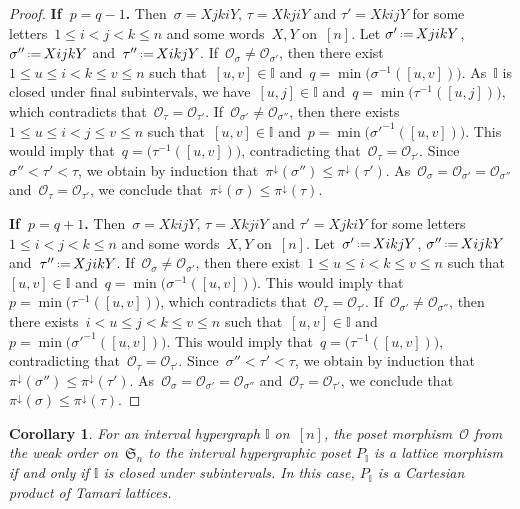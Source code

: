 \documentclass{amsart}
\newtheorem{corollary}[theorem]{Corollary}
\theoremstyle{definition}
\newcommand{\eqdef}{\mbox{\,\raisebox{0.2ex}{\scriptsize\ensuremath{\mathrm:}}\ensuremath{=}\,}} %
\newcommand{\para}[1]{\medskip\noindent\textbf{#1}} %
\newcommand{\fS}{\mathfrak{S}} %
\newcommand{\projDown}{\pi^\downarrow} %
\newcommand{\Or}{\mathcal O}  %
\newcommand{\II}{\mathbb I} %
\begin{document}
\begin{proof}
\para{If~$p = q-1$.} Then~$\sigma = X j k i Y$, $\tau = X k j i Y$ and $\tau' = X k i j Y$ for some letters~$1 \le i < j < k \le n$ and some words~$X,Y$ on~$[n]$.
Let $\sigma' \eqdef X j i k Y$, $\sigma'' \eqdef X i j k Y$ and~$\tau'' \eqdef X i k j Y$.
If~$\Or_\sigma \ne \Or_{\sigma'}$, then there exist~$1 \le u \le i < k \le v \le n$ such that~$[u,v] \in \II$ and~$q = \min \big( \sigma^{-1}([u,v]) \big)$. 
As~$\II$ is closed under final subintervals, we have~$[u,j] \in \II$ and~$q = \min \big( \tau^{-1}([u,j]) \big)$, which contradicts that~$\Or_\tau = \Or_{\tau'}$.
If~$\Or_{\sigma'} \ne \Or_{\sigma''}$, then there exists~$1 \le u \le i < j \le v \le n$ such that~$[u,v] \in \II$ and~$p = \min \big( \sigma'^{-1}([u,v]) \big)$. 
This would imply that~$q = \big( \tau^{-1}([u,v]) \big)$, contradicting that~${\Or_\tau = \Or_{\tau'}}$.
Since~$\sigma'' < \tau' < \tau$, we obtain by induction that~$\projDown(\sigma'') \le \projDown(\tau')$.
As~$\Or_\sigma = \Or_{\sigma'} = \Or_{\sigma''}$ and~${\Or_\tau = \Or_{\tau'}}$, we conclude that~$\projDown(\sigma) \le \projDown(\tau)$.

\para{If~$p = q+1$.} Then~$\sigma = X k i j Y$, $\tau = X k j i Y$ and $\tau' = X j k i Y$ for some letters~${1 \le i < j < k \le n}$ and some words~$X,Y$ on~$[n]$.
Let~$\sigma' \eqdef X i k j Y$, $\sigma'' \eqdef X i j k Y$ and~$\tau'' \eqdef X j i k Y$. 
If~$\Or_\sigma \ne \Or_{\sigma'}$, then there exist~$1 \le u \le i < k \le v \le n$ such that~$[u,v] \in \II$ and~$q = \min \big( \sigma^{-1}([u,v]) \big)$.
This would imply that~$p = \min \big( \tau^{-1}([u,v]) \big)$, which contradicts that~$\Or_\tau = \Or_{\tau'}$.
If~$\Or_{\sigma'} \ne \Or_{\sigma''}$, then there exists~$i < u \le j < k \le v \le n$ such that~$[u,v] \in \II$ and~$p = \min \big( \sigma'^{-1}([u,v]) \big)$. 
This would imply that~$q = \big( \tau^{-1}([u,v]) \big)$, contradicting that~$\Or_\tau = \Or_{\tau'}$.
Since~$\sigma'' < \tau' < \tau$, we obtain by induction that~$\projDown(\sigma'') \le \projDown(\tau')$.
As~$\Or_\sigma = \Or_{\sigma'} = \Or_{\sigma''}$ and~$\Or_\tau = \Or_{\tau'}$, we conclude that~$\projDown(\sigma) \le \projDown(\tau)$.
\end{proof}

\begin{corollary}
For an interval hypergraph $\II$ on~$[n]$, the poset morphism~$\Or$ from the weak order on~$\fS_n$ to the interval hypergraphic poset $P_\II$ is a lattice morphism if and only if $\II$ is closed under subintervals.
In this case, $P_\II$ is a Cartesian product of Tamari lattices.
\end{corollary}
\end{document}
